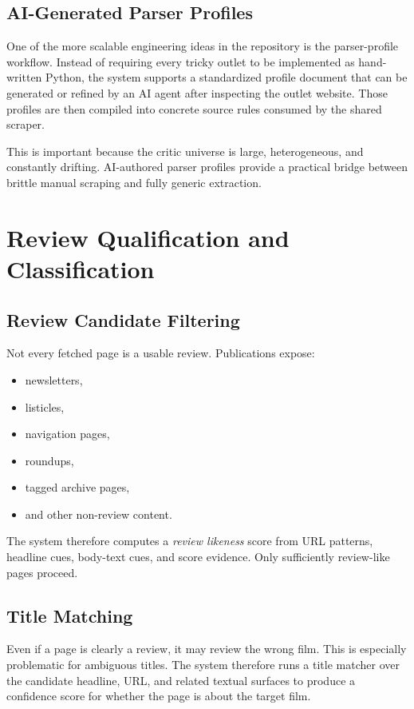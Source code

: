 \documentclass[11pt]{article}
\begin{document}
\subsection{AI-Generated Parser Profiles}
One of the more scalable engineering ideas in the repository is the parser-profile workflow. Instead of requiring every tricky outlet to be implemented as hand-written Python, the system supports a standardized profile document that can be generated or refined by an AI agent after inspecting the outlet website. Those profiles are then compiled into concrete source rules consumed by the shared scraper.

This is important because the critic universe is large, heterogeneous, and constantly drifting. AI-authored parser profiles provide a practical bridge between brittle manual scraping and fully generic extraction.

\section{Review Qualification and Classification}
\subsection{Review Candidate Filtering}
Not every fetched page is a usable review. Publications expose:
\begin{itemize}[leftmargin=1.5em]
    \item newsletters,
    \item listicles,
    \item navigation pages,
    \item roundups,
    \item tagged archive pages,
    \item and other non-review content.
\end{itemize}

The system therefore computes a \emph{review likeness} score from URL patterns, headline cues, body-text cues, and score evidence. Only sufficiently review-like pages proceed.

\subsection{Title Matching}
Even if a page is clearly a review, it may review the wrong film. This is especially problematic for ambiguous titles. The system therefore runs a title matcher over the candidate headline, URL, and related textual surfaces to produce a confidence score for whether the page is about the target film.
\end{document}
